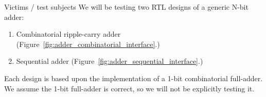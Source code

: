 \documentclass[lab]{course}
\begin{document}
\clearpage

\begin{section}{Victims / test subjects}
    We will be testing two RTL designs of a generic N-bit adder:

    \begin{enumerate}
        \item Combinatorial ripple-carry adder (Figure~\ref{fig:adder_combinatorial_interface}.)
        \item Sequential adder (Figure~\ref{fig:adder_sequential_interface}.)
    \end{enumerate}

    Each design is based upon the implementation of a 1-bit combinatorial full-adder. We assume the 1-bit full-adder is correct, so we will not be explicitly testing it. \\


\end{section}
\end{document}
